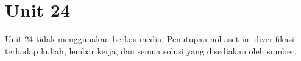 \section*{Unit 24}
Unit 24 tidak menggunakan berkas media. Penutupan nol-aset ini diverifikasi terhadap kuliah, lembar kerja, dan semua solusi yang disediakan oleh sumber.
